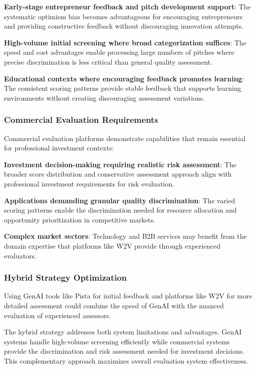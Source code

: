 \textbf{Early-stage entrepreneur feedback and pitch development support}: The systematic optimism bias becomes advantageous for encouraging entrepreneurs and providing constructive feedback without discouraging innovation attempts.

\textbf{High-volume initial screening where broad categorization suffices}: The speed and cost advantages enable processing large numbers of pitches where precise discrimination is less critical than general quality assessment.

\textbf{Educational contexts where encouraging feedback promotes learning}: The consistent scoring patterns provide stable feedback that supports learning environments without creating discouraging assessment variations.

\subsubsection{Commercial Evaluation Requirements}
\label{subsec:commercial-requirements}

Commercial evaluation platforms demonstrate capabilities that remain essential for professional investment contexts:

\textbf{Investment decision-making requiring realistic risk assessment}: The broader score distribution and conservative assessment approach align with professional investment requirements for risk evaluation.

\textbf{Applications demanding granular quality discrimination}: The varied scoring patterns enable the discrimination needed for resource allocation and opportunity prioritization in competitive markets.

\textbf{Complex market sectors}: Technology and B2B services may benefit from the domain expertise that platforms like W2V provide through experienced evaluators.

\subsubsection{Hybrid Strategy Optimization}
\label{subsec:hybrid}

Using GenAI tools like Pista for initial feedback and platforms like W2V for more detailed assessment could combine the speed of GenAI with the nuanced evaluation of experienced assessors.

The hybrid strategy addresses both system limitations and advantages. GenAI systems handle high-volume screening efficiently while commercial systems provide the discrimination and risk assessment needed for investment decisions. This complementary approach maximizes overall evaluation system effectiveness.

